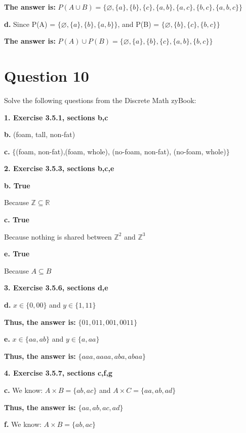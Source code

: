 \documentclass[11pt]{article}
\begin{document}
	\textbf{The answer is:}
	$P(A\cup B)=\{\varnothing,\{a\},\{b\},\{c\},\{a,b\},\{a,c\},\{b,c\},\{a,b,c\}\}$
	
	\textbf{d.}
	Since P(A) = $\{\varnothing,\{a\},\{b\},\{a,b\}\}$, and P(B) = $\{\varnothing,\{b\},\{c\},\{b,c\}\}$
	
	
	\textbf{The answer is:}
	$P(A)\cup P(B)=\{\varnothing,\{a\},\{b\},\{c\},\{a,b\},\{b,c\}\}$
	
	\newpage
	\section*{Question 10}
	
	Solve the following questions from the Discrete Math zyBook:
	
	\textbf{1. Exercise 3.5.1, sections b,c}
	
	\textbf{b.}
	(foam, tall, non-fat)
	
	\textbf{c.}
	$\{$(foam, non-fat),(foam, whole), (no-foam, non-fat), (no-foam, whole)$\}$
	
	\vspace{10mm}
	\textbf{2. Exercise 3.5.3, sections b,c,e}
	
	\textbf{b. True}
	
	Because $\mathbb{Z}\subseteq \mathbb{R}$
	
	\textbf{c. True}
	
	Because nothing is shared between $\mathbb{Z}^2$ and $\mathbb{Z}^3$
	
	\textbf{e. True}
	
	Because $A\subseteq B$
	
	\vspace{10mm}
	\textbf{3. Exercise 3.5.6, sections d,e}
	
	\textbf{d.}
	$x\in \{0,00\}$ and $y\in \{1,11\}$
	
	\textbf{Thus, the answer is:}
	$\{01,011,001,0011\}$
	
	\textbf{e.}
	$x\in \{aa,ab\}$ and $y\in \{a,aa\}$
	
	\textbf{Thus, the answer is:}
	$\{aaa,aaaa,aba,abaa\}$
	
	\vspace{10mm}
	\textbf{4. Exercise 3.5.7, sections c,f,g}
	
	\textbf{c.}
	We know: $A\times B=\{ab,ac\}$ and $A\times C=\{aa,ab,ad\}$
	
	\textbf{Thus, the answer is:}
	$\{aa,ab,ac,ad\}$
	
	\textbf{f.}
	We know: $A\times B=\{ab,ac\}$
	
\end{document}

